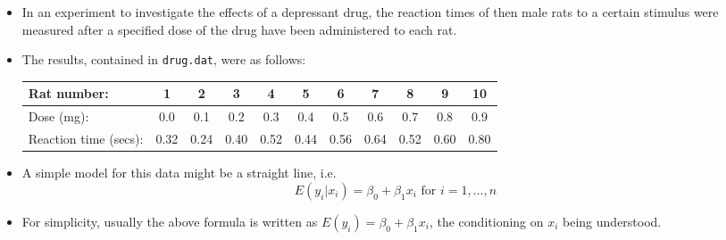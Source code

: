 
\begin{frame}
  \begin{itemize}
    \vspace{0.25cm}
    \item In an experiment to investigate the effects of a depressant drug, the reaction times of then male rats to a certain stimulus were measured after a specified dose of the drug have been administered to each rat.
    \vspace{0.25cm}
    \item The results, contained in \texttt{drug.dat}, were as follows:\\
      \vspace{0.2cm}
      \begin{tiny}
        \begin{tabular}{lcccccccccc}
          \hline
          Rat number: & 1 & 2 & 3& 4&5&6&7&8&9&10\\
          \hline
          Dose (mg): & 0.0&0.1&0.2&0.3&0.4&0.5&0.6&0.7&0.8&0.9\\
          Reaction time (secs): & 0.32&0.24&0.40&0.52&0.44&0.56&0.64&0.52&0.60&0.80\\
          \hline
        \end{tabular}       
      \end{tiny}
    \vspace{0.25cm}
    \item A simple model for this data might be a straight line, i.e.
      $$ E(y_i|x_i) = \beta_0 + \beta_1 x_i \text{  for } i = 1, \dots, n $$
    \item For simplicity, usually the above formula is written as $ E(y_i) = \beta_0 + \beta_1 x_i $, the conditioning on $ x_i $ being understood.
  \end{itemize}
\end{frame}




